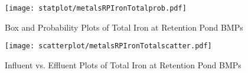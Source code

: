         \begin{figure}[hb]   %
            \centering
            \texttt{[image: statplot/metalsRPIronTotalprob.pdf]}
            \caption{Box and Probability Plots of Total Iron at Retention Pond BMPs}
        \end{figure}         %
        
        
        \begin{figure}[hb]   %
            \centering
            \texttt{[image: scatterplot/metalsRPIronTotalscatter.pdf]}
            \caption{Influent vs. Effluent Plots of Total Iron at Retention Pond BMPs}
        \end{figure}         %
        \clearpage
        
